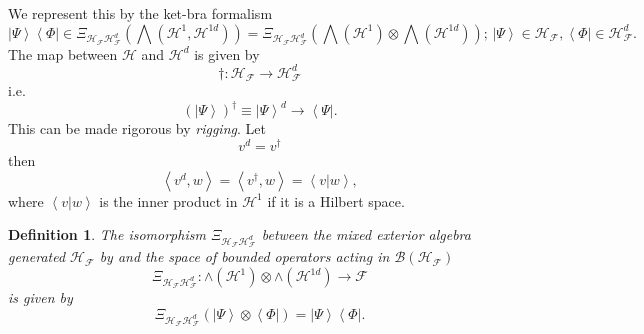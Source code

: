 \documentclass[aps,preprint]{revtex4}%
\newtheorem{definition}[theorem]{Definition}
\begin{document}
We represent this by the ket-bra formalism
\begin{equation}
\left\vert \Psi\right\rangle \left\langle \Phi\right\vert \in\mathcal{\Xi
}_{\mathcal{H}_{\mathcal{F}}\mathcal{H}_{\mathcal{F}}^{d}}\left(
{\textstyle\bigwedge}
\left(  \mathcal{H}^{1},\mathcal{H}^{1d}\right)  \right)  =\mathcal{\Xi
}_{\mathcal{H}_{\mathcal{F}}\mathcal{H}_{\mathcal{F}}^{d}}\left(
{\textstyle\bigwedge}
\left(  \mathcal{H}^{1}\right)  \otimes%
{\textstyle\bigwedge}
\left(  \mathcal{H}^{1d}\right)  \right)  ;\,\left\vert \Psi\right\rangle
\in\mathcal{H}_{\mathcal{F}},\left\langle \Phi\right\vert \in\mathcal{H}%
_{\mathcal{F}}^{d}.
\end{equation}
The map between $\mathcal{H}$ and $\mathcal{H}^{d}$ is given by
\begin{equation}
\dagger:\mathcal{H}_{\mathcal{F}}\rightarrow\mathcal{H}_{\mathcal{F}}^{d}%
\end{equation}
i.e.
\begin{equation}
\left(  \left\vert \Psi\right\rangle \right)  ^{\dagger}\equiv\left\vert
\Psi\right\rangle ^{d}\rightarrow\left\langle \Psi\right\vert .
\end{equation}
This can be made rigorous by \emph{rigging}. Let
\begin{equation}
v^{d}=v^{\dagger}%
\end{equation}
then
\begin{equation}
\left\langle v^{d},w\right\rangle =\left\langle v^{\dagger},w\right\rangle
=\left\langle \left.  v\right\vert w\right\rangle ,
\end{equation}
where $\left\langle \left.  v\right\vert w\right\rangle $ is the inner product
in $\mathcal{H}^{1}$ if it is a Hilbert space.

\begin{definition}
The isomorphism $\mathcal{\Xi}_{\mathcal{H}_{\mathcal{F}}\mathcal{H}%
_{\mathcal{F}}^{d}}$ between the mixed exterior algebra generated
$\mathcal{H}_{\mathcal{F}}$ by and the space of bounded operators acting in
$\mathcal{B}\left(  \mathcal{H}_{\mathcal{F}}\right)  $
\begin{equation}
\mathcal{\Xi}_{\mathcal{H}_{\mathcal{F}}\mathcal{H}_{\mathcal{F}}^{d}}%
:\wedge\left(  \mathcal{H}^{1}\right)  \otimes\wedge\left(  \mathcal{H}%
^{1d}\right)  \rightarrow\mathcal{F}%
\end{equation}
is given by
\begin{equation}
\mathcal{\Xi}_{\mathcal{H}_{\mathcal{F}}\mathcal{H}_{\mathcal{F}}^{d}}\left(
\left\vert \Psi\right\rangle \otimes\left\langle \Phi\right\vert \right)
=\left\vert \Psi\right\rangle \left\langle \Phi\right\vert .
\end{equation}

\end{definition}
\end{document}
